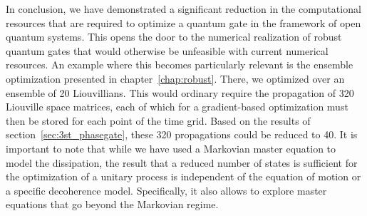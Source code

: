 \enlargethispage{\baselineskip}
In conclusion, we have demonstrated a significant reduction in the computational
resources that are required to optimize a quantum gate in the framework of open
quantum systems. This opens the door to the numerical realization of robust
quantum gates that would otherwise be unfeasible with current numerical
resources. An example where this becomes particularly relevant is the ensemble
optimization presented in chapter~\ref{chap:robust}. There, we optimized over an
ensemble of 20 Liouvillians. This would ordinary require the propagation of 320
Liouville space matrices, each of which for a gradient-based optimization must
then be stored for each point of the time grid. Based on the results of
section~\ref{sec:3st_phasegate}, these 320 propagations could be reduced to 40.
It is important to note that while we have used a Markovian
master equation to model the dissipation, the result that a reduced number of
states is sufficient for the optimization of a unitary process is independent of
the equation of motion or a specific decoherence model. Specifically, it also
allows to explore master equations that go beyond the Markovian regime.
